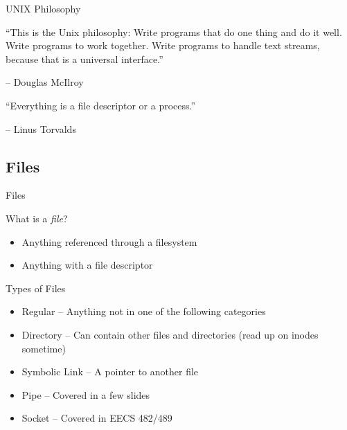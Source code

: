 \documentclass[table,dvipsnames]{beamer}
\begin{document}
\begin{frame}{UNIX Philosophy}
	\begin{block}{}
		``This is the Unix philosophy: Write programs that do one thing and do 
		it well. Write programs to work together. Write programs to handle text
		streams, because that is a universal interface.''

		\hfill -- Douglas McIlroy
	\end{block}
	\begin{block}{}
		``Everything is a file descriptor or a process.''

		\hfill -- Linus Torvalds
	\end{block}
\end{frame}

\subsection{Files}
\begin{frame}{Files}
	\begin{block}{What is a \emph{file}?}
		\begin{itemize}
			\item Anything referenced through a filesystem
			\item Anything with a file descriptor
		\end{itemize}
	\end{block}
\end{frame}

\begin{frame}{Types of Files}
	\begin{itemize}
		\item Regular -- Anything not in one of the following categories
		\item Directory -- Can contain other files and directories (read up on
			inodes sometime)
		\item Symbolic Link -- A pointer to another file
		\item Pipe -- Covered in a few slides 
		\item Socket -- Covered in EECS 482/489
	\end{itemize}
\end{frame}
\end{document}
